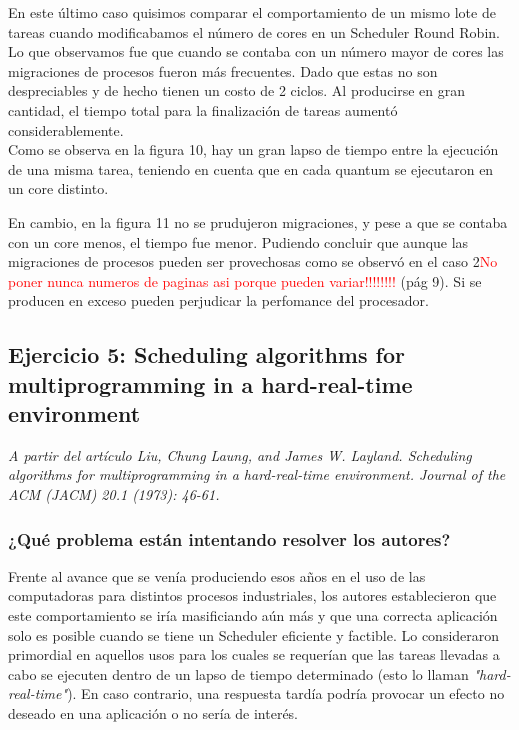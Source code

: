 \documentclass[a4paper]{article}
\begin{document}
 \bigskip

En este último caso quisimos comparar el comportamiento de un mismo lote de tareas cuando modificabamos el número de cores en un Scheduler Round Robin.\\

 Lo que observamos fue que cuando se contaba con un número mayor de cores las migraciones de procesos fueron m\'as frecuentes. Dado que estas no son despreciables y de hecho tienen un costo de 2 ciclos. Al producirse en gran cantidad, el tiempo total para la finalización de tareas aumentó considerablemente. \\
 
 Como se observa en la figura 10, hay un gran lapso de tiempo entre la ejecución de una misma tarea, teniendo en cuenta que en cada quantum se ejecutaron en un core distinto. 
 
 En cambio, en la figura 11 no se prudujeron migraciones, y pese a que se contaba con un core menos, el tiempo fue menor. Pudiendo concluir que aunque las migraciones de procesos pueden ser provechosas como se observó en el caso 2\textcolor{red}{No poner nunca numeros de paginas asi porque pueden variar!!!!!!!!} (pág 9). Si se producen en exceso pueden perjudicar la perfomance del procesador.  

\newpage

 \subsection{Ejercicio 5: Scheduling algorithms for multiprogramming in a hard-real-time environment}
 
\textit{A partir del art\'iculo Liu, Chung Laung, and James W. Layland. Scheduling algorithms for multiprogramming in a hard-real-time environment. Journal of the ACM (JACM) 20.1 (1973): 46-61.}


\subsubsection{¿Qu\'e problema est\'an intentando resolver los autores?}

Frente al avance que se ven\'ia produciendo esos años en el uso de las computadoras para distintos procesos industriales, los autores establecieron que este comportamiento se iría masificiando aún más y que una correcta aplicación solo es posible cuando se tiene un Scheduler eficiente y factible. Lo consideraron primordial en aquellos usos para los cuales se requerían que las tareas llevadas a cabo se ejecuten dentro de un lapso de tiempo determinado (esto lo llaman \textit{"hard-real-time"}). En caso contrario, una respuesta tardía podría provocar un efecto no deseado en una aplicación o no sería de interés. \\
\end{document}
